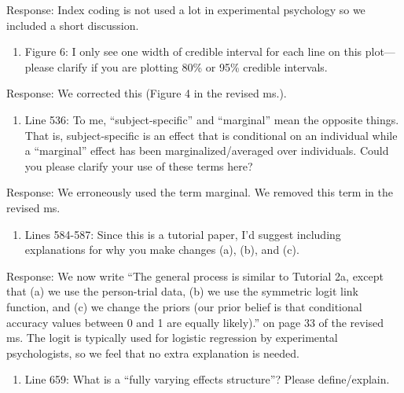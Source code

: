 \documentclass[
]{article}
\providecommand{\tightlist}{%
  \setlength{\itemsep}{0pt}\setlength{\parskip}{0pt}}
\renewenvironment{quote}{\begin{leftbar}}{\end{leftbar}}
\begin{document}
Response: Index coding is not used a lot in experimental psychology so
we included a short discussion.

\begin{quote}
\begin{enumerate}
\def\labelenumi{\arabic{enumi}.}
\setcounter{enumi}{11}
\tightlist
\item
  Figure 6: I only see one width of credible interval for each line on
  this plot--- please clarify if you are plotting 80\% or 95\% credible
  intervals.
\end{enumerate}
\end{quote}

Response: We corrected this (Figure 4 in the revised ms.).

\begin{quote}
\begin{enumerate}
\def\labelenumi{\arabic{enumi}.}
\setcounter{enumi}{12}
\tightlist
\item
  Line 536: To me, ``subject-specific'' and ``marginal'' mean the
  opposite things. That is, subject-specific is an effect that is
  conditional on an individual while a ``marginal'' effect has been
  marginalized/averaged over individuals. Could you please clarify your
  use of these terms here?
\end{enumerate}
\end{quote}

Response: We erroneously used the term marginal. We removed this term in
the revised ms.

\begin{quote}
\begin{enumerate}
\def\labelenumi{\arabic{enumi}.}
\setcounter{enumi}{13}
\tightlist
\item
  Lines 584-587: Since this is a tutorial paper, I'd suggest including
  explanations for why you make changes (a), (b), and (c).
\end{enumerate}
\end{quote}

Response: We now write ``The general process is similar to Tutorial 2a,
except that (a) we use the person-trial data, (b) we use the symmetric
logit link function, and (c) we change the priors (our prior belief is
that conditional accuracy values between 0 and 1 are equally likely).''
on page 33 of the revised ms. The logit is typically used for logistic
regression by experimental psychologists, so we feel that no extra
explanation is needed.

\begin{quote}
\begin{enumerate}
\def\labelenumi{\arabic{enumi}.}
\setcounter{enumi}{14}
\tightlist
\item
  Line 659: What is a ``fully varying effects structure''? Please
  define/explain.
\end{enumerate}
\end{quote}
\end{document}
